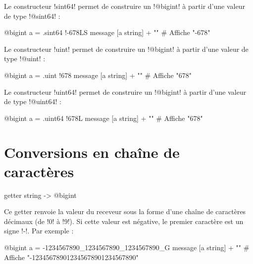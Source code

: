 
Le constructeur \ggs!sint64! permet de construire un \ggs!@bigint! à partir d'une valeur de type \ggs!@sint64! :
\begin{galgas}
@bigint a = .sint64 {!-678LS}
message [a string] + "\n" # Affiche "-678"
\end{galgas}





Le constructeur \ggs!uint! permet de construire un \ggs!@bigint! à partir d'une valeur de type \ggs!@uint! :
\begin{galgas}
@bigint a = .uint {!678}
message [a string] + "\n" # Affiche "678"
\end{galgas}





Le constructeur \ggs!uint64! permet de construire un \ggs!@bigint! à partir d'une valeur de type \ggs!@uint64! :
\begin{galgas}
@bigint a = .uint64 {!678L}
message [a string] + "\n" # Affiche "678"
\end{galgas}









\section{Conversions en chaîne de caractères}


\begin{galgas}
getter string -> @bigint
\end{galgas}

Ce getter renvoie la valeur du receveur sous la forme d'une chaîne de caractères décimaux (de \ggs!0! à \ggs!9!). Si cette valeur est négative, le premier caractère est un signe \ggs!-!. Par exemple :

\begin{galgas}
@bigint a = -1234567890_1234567890_1234567890_G
message [a string] + "\n" # Affiche "-123456789012345678901234567890"
\end{galgas}






